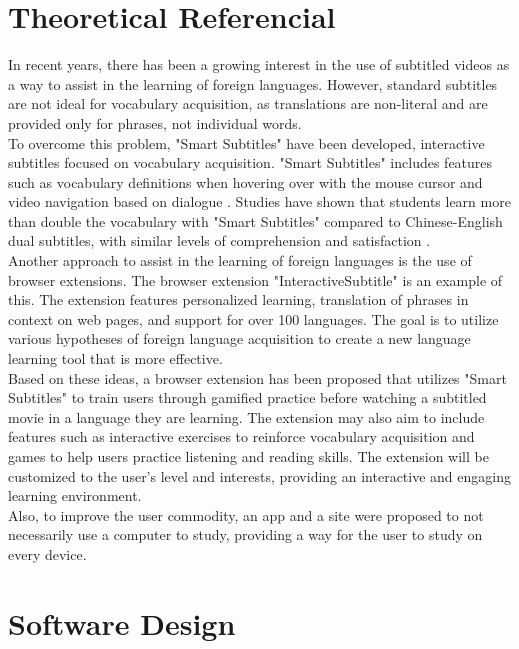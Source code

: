 \documentclass[12pt]{article}
\begin{document}
\section{Theoretical Referencial}
In recent years, there has been a growing interest in the use of subtitled videos as a way to assist in the learning of foreign languages. However, standard subtitles are not ideal for vocabulary acquisition, as translations are non-literal and are provided only for phrases, not individual words. \\
To overcome this problem, "Smart Subtitles" have been developed, interactive subtitles focused on vocabulary acquisition. "Smart Subtitles" includes features such as vocabulary definitions when hovering over with the mouse cursor and video navigation based on dialogue \cite{Kovacs13}. Studies have shown that students learn more than double the vocabulary with "Smart Subtitles" compared to Chinese-English dual subtitles, with similar levels of comprehension and satisfaction \cite{Kovacs14}. \\ 
Another approach to assist in the learning of foreign languages is the use of browser extensions. The browser extension "InteractiveSubtitle" \cite{ElBatanony21} is an example of this. The extension features personalized learning, translation of phrases in context on web pages, and support for over 100 languages. The goal is to utilize various hypotheses of foreign language acquisition to create a new language learning tool that is more effective. \\ 
Based on these ideas, a browser extension has been proposed that utilizes "Smart Subtitles" to train users through gamified practice before watching a subtitled movie in a language they are learning. The extension may also aim to include features such as interactive exercises to reinforce vocabulary acquisition and games to help users practice listening and reading skills. The extension will be customized to the user's level and interests, providing an interactive and engaging learning environment. \\
Also, to improve the user commodity, an app and a site were proposed to not necessarily use a computer to study, providing a way for the user to study on every device. 
\section{Software Design}
\end{document}
